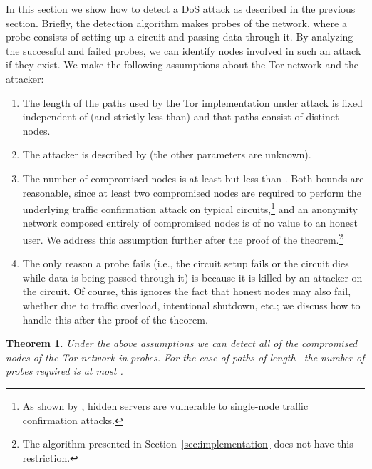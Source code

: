 \documentclass[]{lmcs}
\let\citeN\citet
\newtheorem{theorem}{Theorem}[section]
\begin{document}
In this section we show how to detect a DoS attack as described in
the previous section.  
Briefly, the detection algorithm makes  probes of the network, where
a probe consists of setting up a circuit and passing data through it.
By analyzing the successful and failed probes, we can identify nodes
involved in such an attack if they exist.
We make the following assumptions
about the Tor network and the attacker:
\begin{enumerate}
\item The length of the paths used by the Tor implementation under
attack is fixed independent of (and strictly less than)  and that
paths consist of distinct nodes.
\item The attacker is described by 
(the other parameters are unknown).
\item The number of compromised nodes is at least  but less than .  Both
bounds are reasonable, since at least two compromised nodes are required to
perform the underlying traffic confirmation attack on typical
circuits,\footnote{As shown by \citeN{syverson-ieee06},
hidden servers are vulnerable to single-node traffic confirmation attacks.}  
and an anonymity
network composed entirely of compromised nodes is of no value to an
honest user.
We address this assumption further after the proof of the theorem.\footnote{The algorithm presented
in Section~\ref{sec:implementation} does not have this restriction.}
\item The only reason
a probe fails (i.e., the circuit setup fails or the circuit dies while
data is being passed through it)
is because it is killed by an attacker on the circuit.
Of course, this ignores the fact that honest nodes may also fail,
whether due to traffic overload, intentional shutdown, etc.; we discuss
how to handle this after the proof of the theorem.
\end{enumerate}


\begin{theorem}
\label{main-theorem}
Under the above assumptions we can detect all of
the compromised nodes of the Tor network in  probes. 
For the case of paths of 
length~ the number of probes required is at most .
\end{theorem}
\end{document}
